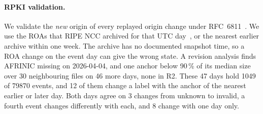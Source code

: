 \paragraph{RPKI validation.}
We validate the \emph{new} origin of every replayed origin change under RFC~6811~\cite{rfc6811}.
We use the ROAs that RIPE NCC archived for that UTC day~\cite{ripe_rpki_archive}, or the nearest earlier archive within one week.
The archive has no documented snapshot time, so a ROA change on the event day can give the wrong state.
A revision analysis finds AFRINIC missing on 2026-04-04, and one anchor below 90\,\% of its median size over 30 neighbouring files on 46 more days, none in R2.
These 47 days hold \num{1049} of \num{79870} events, and 12 of them change a label with the anchor of the nearest earlier or later day.
Both days agree on 3 changes from unknown to invalid, a fourth event changes differently with each, and 8 change with one day only.
